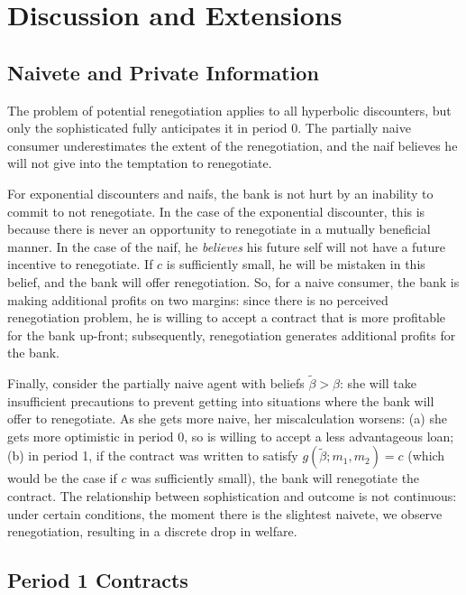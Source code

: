 \documentclass[11pt]{article}%
\begin{document}
\section{Discussion and Extensions}

\subsection{Naivete and Private Information}

The problem of potential renegotiation applies to all hyperbolic discounters,
but only the sophisticated fully anticipates it in period 0. The partially
naive consumer underestimates the extent of the renegotiation, and the naif
believes he will not give into the temptation to renegotiate.

For exponential discounters and naifs, the bank is not hurt by an inability to
commit to not renegotiate. In the case of the exponential discounter, this is
because there is never an opportunity to renegotiate in a mutually beneficial
manner. In the case of the naif, he \textit{believes} his future self will not
have a future incentive to renegotiate. If $c$ is sufficiently small, he will
be mistaken in this belief, and the bank will offer renegotiation. So, for a
naive consumer, the bank is making additional profits on two margins: since
there is no perceived renegotiation problem, he is willing to accept a
contract that is more profitable for the bank up-front; subsequently,
renegotiation generates additional profits for the bank.

Finally, consider the partially naive agent with beliefs $\tilde{\beta}>\beta
$: she will take insufficient precautions to prevent getting into situations
where the bank will offer to renegotiate. As she gets more naive, her
miscalculation worsens: (a) she gets more optimistic in period 0, so is
willing to accept a less advantageous loan; (b) in period 1, if the contract
was written to satisfy $g\left(  \tilde{\beta};m_{1},m_{2}\right)  =c$ (which
would be the case if $c$ was sufficiently small), the bank will renegotiate
the contract. The relationship between sophistication and outcome is not
continuous: under certain conditions, the moment there is the slightest
naivete, we observe renegotiation, resulting in a discrete drop in welfare.

\subsection{Period 1 Contracts}
\end{document}
